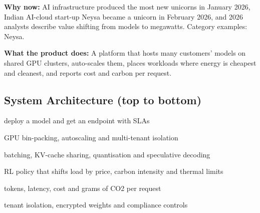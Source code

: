 \documentclass[10pt,a4paper]{article}
\begin{document}
\begin{tcolorbox}[colback=l1bg,colframe=l1bg,arc=2pt,borderline west={3pt}{0pt}{saffron},top=2pt,bottom=2pt]\small\textbf{Why now:} AI infrastructure produced the most new unicorns in January 2026, Indian AI-cloud start-up Neysa became a unicorn in February 2026, and 2026 analysts describe value shifting from models to megawatts. {\color{muted}Category examples: Neysa.}\end{tcolorbox}
\begin{tcolorbox}[colback=l3bg,colframe=l3bg,arc=2pt,borderline west={3pt}{0pt}{igreen},top=2pt,bottom=2pt]\small\textbf{What the product does:} A platform that hosts many customers' models on shared GPU clusters, auto-scales them, places workloads where energy is cheapest and cleanest, and reports cost and carbon per request.\end{tcolorbox}
\subsection*{System Architecture (top to bottom)}
\begin{tcolorbox}[colback=lay0,colframe=lay0,arc=2pt,top=1.5pt,bottom=1.5pt,left=6pt,before skip=2pt,after skip=2pt]\small{} deploy a model and get an endpoint with SLAs\end{tcolorbox}
\begin{tcolorbox}[colback=lay1,colframe=lay1,arc=2pt,top=1.5pt,bottom=1.5pt,left=6pt,before skip=2pt,after skip=2pt]\small{} GPU bin-packing, autoscaling and multi-tenant isolation\end{tcolorbox}
\begin{tcolorbox}[colback=lay2,colframe=lay2,arc=2pt,top=1.5pt,bottom=1.5pt,left=6pt,before skip=2pt,after skip=2pt]\small{} batching, KV-cache sharing, quantisation and speculative decoding\end{tcolorbox}
\begin{tcolorbox}[colback=lay3,colframe=lay3,arc=2pt,top=1.5pt,bottom=1.5pt,left=6pt,before skip=2pt,after skip=2pt]\small{} RL policy that shifts load by price, carbon intensity and thermal limits\end{tcolorbox}
\begin{tcolorbox}[colback=lay4,colframe=lay4,arc=2pt,top=1.5pt,bottom=1.5pt,left=6pt,before skip=2pt,after skip=2pt]\small{} tokens, latency, cost and grams of CO2 per request\end{tcolorbox}
\begin{tcolorbox}[colback=lay5,colframe=lay5,arc=2pt,top=1.5pt,bottom=1.5pt,left=6pt,before skip=2pt,after skip=2pt]\small{} tenant isolation, encrypted weights and compliance controls\end{tcolorbox}
\end{document}
